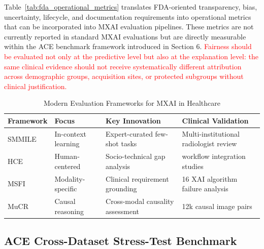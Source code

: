 \documentclass[pdflatex,sn-mathphys-num]{sn-jnl}%
\theoremstyle{thmstyleone}%
\theoremstyle{thmstyletwo}%
\theoremstyle{thmstylethree}%
\begin{document}
\begin{itemize}
\begin{table}[h!]
{\begin{tabularx}{\textwidth}{|L{2.0cm}|L{2.5cm}|L{3.0cm}|L{3.0cm}|X|}
\end{tabularx}
\par}
\end{table}

Table~\ref{tab:fda_operational_metrics} translates FDA-oriented transparency, bias, uncertainty, lifecycle, and documentation requirements into operational metrics that can be incorporated into MXAI evaluation pipelines.
These metrics are not currently reported in standard MXAI evaluations but are directly measurable within the ACE benchmark framework introduced in Section 6.
\textcolor{red}{Fairness should be evaluated not only at the predictive level but also at the explanation level: the same clinical evidence should not receive systematically different attribution across demographic groups, acquisition sites, or protected subgroups without clinical justification. }

\begin{table}[h!]
\centering
\caption{Modern Evaluation Frameworks for MXAI in Healthcare}
{\scriptsize
\setlength{\tabcolsep}{3pt}
\renewcommand{\arraystretch}{1.15}
\begin{tabularx}{\textwidth}{|L{2.4cm}|L{3.0cm}|L{4.0cm}|X|}
\hline
\textbf{Framework} & \textbf{Focus} & \textbf{Key Innovation} & \textbf{Clinical Validation} \\ \hline
SMMILE \cite{rieff2025smmileexpertdrivenbenchmarkmultimodal} & In-context learning & Expert-curated few-shot tasks & Multi-institutional radiologist review \\ \hline
HCE \cite{gambetti2025surveyhumancenteredevaluationexplainable} & Human-centered & Socio-technical gap analysis & workflow integration studies \\ \hline
MSFI \cite{Jin_2022} & Modality-specific & Clinical requirement grounding & 16 XAI algorithm failure analysis \\ \hline
MuCR \cite{li2025multimodalcausalreasoningbenchmark} & Causal reasoning & Cross-modal causality assessment & 12k causal image pairs \\ \hline
\end{tabularx}
\par}
\label{tab:evaluation_frameworks}
\end{table}

\subsection{ACE Cross-Dataset Stress-Test Benchmark}
\label{sec:ace_cross_dataset_suite}


\end{itemize}
\end{document}
